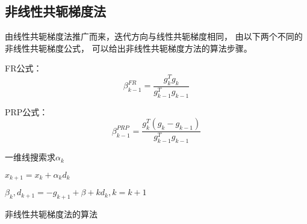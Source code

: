                
    \subsection{非线性共轭梯度法}
    由线性共轭梯度法推广而来，迭代方向与线性共轭梯度相同，
    由以下两个不同的非线性共轭梯度公式，
    可以给出非线性共轭梯度方法的算法步骤。
    
        FR公式：
        \begin{equation}
            \beta_{k-1}^{FR}=\displaystyle\frac{g_k^Tg_k}{g_{k-1}^Tg_{k-1}}
        \end{equation}
               
        PRP公式：
        \begin{equation}
            \beta_{k-1}^{PRP}=\displaystyle\frac{g_k^T(g_k-g_{k-1})}{g_{k-1}^Tg_{k-1}}
        \end{equation}
        
        
        
        
        
        \begin{algorithm}
        
            \SetAlgoLined
        
             {
                一维线搜索求$\alpha_k$
                
                $x_{k+1}=x_k+\alpha_kd_k$
        
                $\beta_k,d_{k+1}=-g_{k+1}+\beta+kd_k,k=k+1$
            }
            \caption{非线性共轭梯度法的算法}
        \end{algorithm}
        
